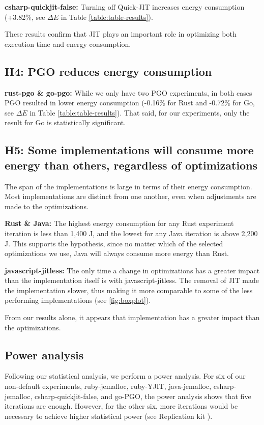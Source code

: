 \documentclass[main.tex]{subfiles}
\begin{document}
\textbf{csharp-quickjit-false:} Turning off Quick-JIT increases energy consumption (+3.82\%, see $\Delta E$ in Table \ref{table:table-results}).

These results confirm that JIT plays an important role in optimizing both execution time and energy consumption.

\subsection{H4: PGO reduces energy consumption}

\textbf{rust-pgo \& go-pgo:} While we only have two PGO experiments, in both cases PGO resulted in lower energy consumption (-0.16\% for Rust and -0.72\% for Go, see $\Delta E$ in Table \ref{table:table-results}). That said, for our experiments, only the result for Go is statistically significant.



\subsection{H5: Some implementations will consume more energy than others, regardless of optimizations}

The span of the implementations is large in terms of their energy consumption. Most implementations are distinct from one another, even when adjustments are made to the optimizations.

\textbf{Rust \& Java:} The highest energy consumption for any Rust experiment iteration is less than 1,400 J, and the lowest for any Java iteration is above 2,200 J. This supports the hypothesis, since no matter which of the selected optimizations we use, Java will always consume more energy than Rust.

\textbf{javascript-jitless:} The only time a change in optimizations has a greater impact than the implementation itself is with javascript-jitless. The removal of JIT made the implementation slower, thus making it more comparable to some of the less performing implementations (see \ref{fig:boxplot}). 

From our results alone, it appears that implementation has a greater impact than the optimizations. 

\subsection{Power analysis}
Following our statistical analysis, we perform a power analysis. For six of our non-default experiments, ruby-jemalloc, ruby-YJIT, java-jemalloc, csharp-jemalloc, csharp-quickjit-false, and go-PGO, the power analysis shows that five iterations are enough. However, for the other six, more iterations would be necessary to achieve higher statistical power (see Replication kit \cite{replication-kit-Karlsen_Landsgaard_Offenberg_Pedersen_2025}).
\end{document}
